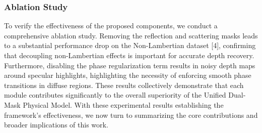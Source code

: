 \subsubsection{Ablation Study}

To verify the effectiveness of the proposed components, we conduct a comprehensive ablation study. Removing the reflection and scattering masks leads to a substantial performance drop on the Non-Lambertian dataset [4], confirming that decoupling non-Lambertian effects is important for accurate depth recovery. Furthermore, disabling the phase regularization term results in noisy depth maps around specular highlights, highlighting the necessity of enforcing smooth phase transitions in diffuse regions. These results collectively demonstrate that each module contributes significantly to the overall superiority of the Unified Dual-Mask Physical Model. With these experimental results establishing the framework's effectiveness, we now turn to summarizing the core contributions and broader implications of this work.
